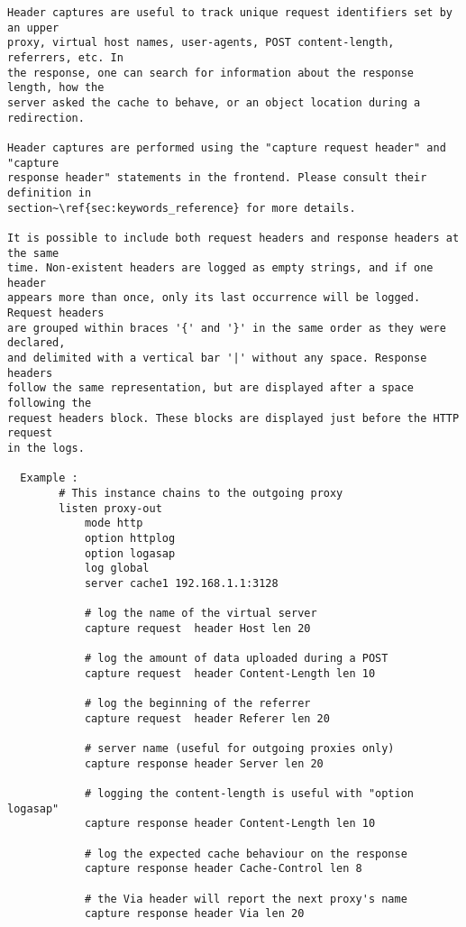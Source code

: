 \begin{verbatim}
Header captures are useful to track unique request identifiers set by an upper
proxy, virtual host names, user-agents, POST content-length, referrers, etc. In
the response, one can search for information about the response length, how the
server asked the cache to behave, or an object location during a redirection.

Header captures are performed using the "capture request header" and "capture
response header" statements in the frontend. Please consult their definition in
section~\ref{sec:keywords_reference} for more details.

It is possible to include both request headers and response headers at the same
time. Non-existent headers are logged as empty strings, and if one header
appears more than once, only its last occurrence will be logged. Request headers
are grouped within braces '{' and '}' in the same order as they were declared,
and delimited with a vertical bar '|' without any space. Response headers
follow the same representation, but are displayed after a space following the
request headers block. These blocks are displayed just before the HTTP request
in the logs.

  Example :
        # This instance chains to the outgoing proxy
        listen proxy-out
            mode http
            option httplog
            option logasap
            log global
            server cache1 192.168.1.1:3128

            # log the name of the virtual server
            capture request  header Host len 20

            # log the amount of data uploaded during a POST
            capture request  header Content-Length len 10

            # log the beginning of the referrer
            capture request  header Referer len 20

            # server name (useful for outgoing proxies only)
            capture response header Server len 20

            # logging the content-length is useful with "option logasap"
            capture response header Content-Length len 10

            # log the expected cache behaviour on the response
            capture response header Cache-Control len 8

            # the Via header will report the next proxy's name
            capture response header Via len 20


\end{verbatim}
